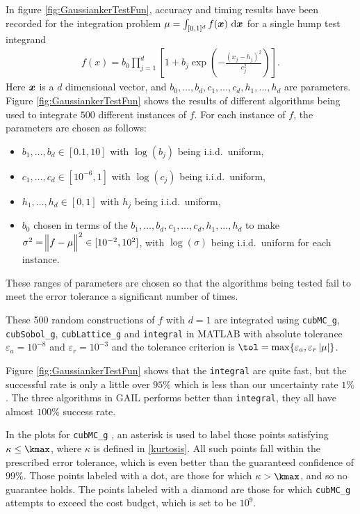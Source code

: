 \documentclass{iitthesis}
\begin{document}
In figure \ref{fig:GaussiankerTestFun}, accuracy and timing results have been recorded for the integration problem 
$\mu=\int_{[0,1]^d} f(\vx) \, \dif \vx$ for a single hump test integrand
\begin{align}\label{GaussiankerTestFun}
f(x) = b_0\prod_{j=1}^d\left[ 1 +b_j \exp \left(-\frac{(x_j-h_j)^2}{c_j^2}\right) \right].
\end{align}
Here $\boldsymbol{x}$ is a $d$ dimensional vector, and $ b_0, \ldots, b_d, c_1, \ldots, c_d, h_1, \ldots, h_d$ are parameters. Figure \ref{fig:GaussiankerTestFun} shows the results of different algorithms being used to integrate $500$ different instances of $f$.  For each instance of $f$, the parameters are chosen as follows:
\begin{itemize} 
\item $b_1, \ldots, b_d \in [0.1,10]$ with $\log(b_j)$ being i.i.d.\ uniform,
\item $c_1, \ldots, c_d \in [10^{-6},1]$ with $\log(c_j)$ being i.i.d.\ uniform,
\item $h_1, \ldots, h_d \in [0,1]$ with $h_j$ being i.i.d.\ uniform,
\item $b_0$ chosen in terms of the $b_1, \ldots, b_d, c_1, \ldots, c_d, h_1, \ldots, h_d$ to make $\sigma^2 =\norm[2]{f-\mu}^2 \in [10^{-2}, 10^2]$, with $\log(\sigma)$ being i.i.d.\ uniform for each instance.
\end{itemize}
These ranges of parameters are chosen so that the algorithms being tested fail to meet the error tolerance a significant number of times.

These 500 random constructions of $f$ with $d=1$ are integrated using  {\tt cubMC\_g}, {\tt cubSobol\_g}, {\tt cubLattice\_g} and {\tt integral} in MATLAB with absolute tolerance $\varepsilon_a = 10^{-8}$ and $\varepsilon_r=10^{-3}$ and the tolerance criterion is $\tol = \max \{ \varepsilon_a, \varepsilon_r \abs{\mu}\}$. 

Figure \ref{fig:GaussiankerTestFun} shows that the {\tt integral} are quite fast, but the successful rate is only a little over $95\%$ which is less than our uncertainty rate $1\%$. The three algorithms in GAIL performs better than {\tt integral}, they all have almost $100\%$ success rate.

In the plots for {\tt cubMC\_g} , an asterisk is used to label those points satisfying $\kappa \le \kmax$, where $\kappa$ is defined in \eqref{kurtosis}. All such points fall within the prescribed error tolerance,
which is even better than the guaranteed confidence of $99\%$.  Those points labeled with a dot, are those for which $\kappa > \kmax$, and so no guarantee holds. The points labeled with a diamond are those for which  {\tt cubMC\_g}  attempts to exceed the cost budget, which is set to be $10^{9}$.
\end{document}

